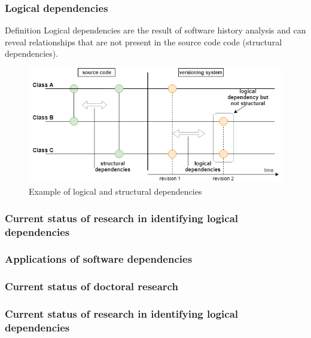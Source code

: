 \documentclass{beamer}
\begin{document}
 \begin{frame}
\frametitle{Logical dependencies}
\begin{block}{Definition}
 Logical dependencies are the result of software history analysis and can reveal relationships that are not present in the source code code (structural dependencies).
\end{block}

\begin{center}
     \begin{figure}
	\includegraphics[width=\textwidth]{fig1.png}
	\caption{\label{fig:fig1}Example of logical and structural dependencies}
     \end{figure}
\end{center}

\end{frame}


 \begin{frame}
\frametitle{Current status of research in identifying logical dependencies}


\end{frame}


 \begin{frame}
\frametitle{Applications of software dependencies}


\end{frame}


 \begin{frame}
\frametitle{Current status of doctoral research}


\end{frame}


 \begin{frame}
\frametitle{Current status of research in identifying logical dependencies}


\end{frame}
\end{document}

